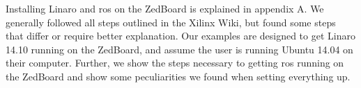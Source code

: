 \documentclass[thesis.tex]{subfile}
\begin{document}
Installing Linaro and \gls{ros} on the ZedBoard is explained in appendix A. We generally followed all steps outlined in the Xilinx Wiki, but found some steps that differ or require better explanation. Our examples are designed to get Linaro 14.10 running on the ZedBoard, and assume the user is running Ubuntu 14.04 on their computer. Further, we show the steps necessary to getting \gls{ros} running on the ZedBoard and show some peculiarities we found when setting everything up.
\end{document}
